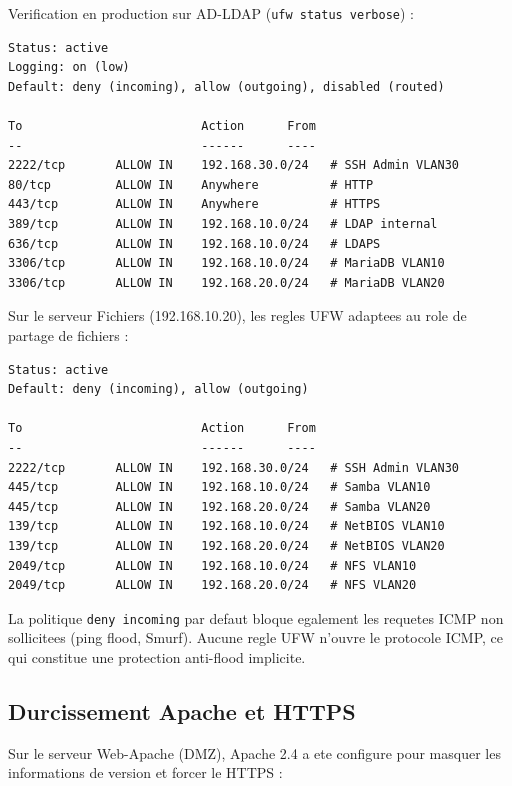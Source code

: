 \documentclass[11pt,a4paper]{article}
\begin{document}
Verification en production sur AD-LDAP (\texttt{ufw status verbose}) :

\begin{lstlisting}[caption={Sortie reelle -- ufw status verbose sur AD-LDAP (192.168.10.10)}]
Status: active
Logging: on (low)
Default: deny (incoming), allow (outgoing), disabled (routed)

To                         Action      From
--                         ------      ----
2222/tcp       ALLOW IN    192.168.30.0/24   # SSH Admin VLAN30
80/tcp         ALLOW IN    Anywhere          # HTTP
443/tcp        ALLOW IN    Anywhere          # HTTPS
389/tcp        ALLOW IN    192.168.10.0/24   # LDAP internal
636/tcp        ALLOW IN    192.168.10.0/24   # LDAPS
3306/tcp       ALLOW IN    192.168.10.0/24   # MariaDB VLAN10
3306/tcp       ALLOW IN    192.168.20.0/24   # MariaDB VLAN20
\end{lstlisting}

Sur le serveur Fichiers (192.168.10.20), les regles UFW adaptees au role de partage de fichiers :

\begin{lstlisting}[caption={Sortie reelle -- ufw status verbose sur Fichiers (192.168.10.20)}]
Status: active
Default: deny (incoming), allow (outgoing)

To                         Action      From
--                         ------      ----
2222/tcp       ALLOW IN    192.168.30.0/24   # SSH Admin VLAN30
445/tcp        ALLOW IN    192.168.10.0/24   # Samba VLAN10
445/tcp        ALLOW IN    192.168.20.0/24   # Samba VLAN20
139/tcp        ALLOW IN    192.168.10.0/24   # NetBIOS VLAN10
139/tcp        ALLOW IN    192.168.20.0/24   # NetBIOS VLAN20
2049/tcp       ALLOW IN    192.168.10.0/24   # NFS VLAN10
2049/tcp       ALLOW IN    192.168.20.0/24   # NFS VLAN20
\end{lstlisting}

La politique \texttt{deny incoming} par defaut bloque egalement les requetes ICMP non sollicitees (ping flood, Smurf). Aucune regle UFW n'ouvre le protocole ICMP, ce qui constitue une protection anti-flood implicite.

\subsection{Durcissement Apache et HTTPS}

Sur le serveur Web-Apache (DMZ), Apache 2.4 a ete configure pour masquer les informations de version et forcer le HTTPS :
\end{document}
